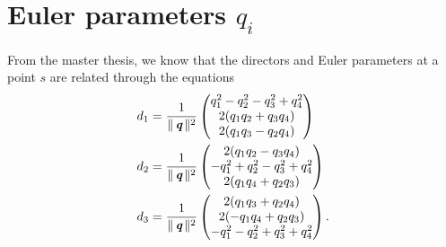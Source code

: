 \documentclass[11pt,letterpaper]{amsart}
\DeclareMathOperator*{\qq}{\textit{\textbf{q}}}
\begin{document}
%
%

\section{Euler parameters $ q_i $}

From the master thesis, we know that the directors and Euler parameters at a point $ s $ are related through the equations
\begin{align}\label{eq:qs}
d_1 &= \frac{1}{\|\qq\|^2} 
\begin{pmatrix}
q_1^2-q_2^2-q_3^2+q_4^2 \\
2(q_1q_2+q_3q_4) \\
2(q_1q_3-q_2q_4)
\end{pmatrix} \\
d_2 &= \frac{1}{\|\qq\|^2} 
\begin{pmatrix}
2(q_1q_2-q_3q_4) \\
-q_1^2+q_2^2-q_3^2+q_4^2 \\
2(q_1q_4+q_2q_3)
\end{pmatrix} \\
d_3 &= \frac{1}{\|\qq\|^2} 
\begin{pmatrix}
2(q_1q_3+q_2q_4) \\
2(-q_1q_4+q_2q_3) \\
-q_1^2-q_2^2+q_3^2+q_4^2
\end{pmatrix}.
\end{align}
\end{document}
